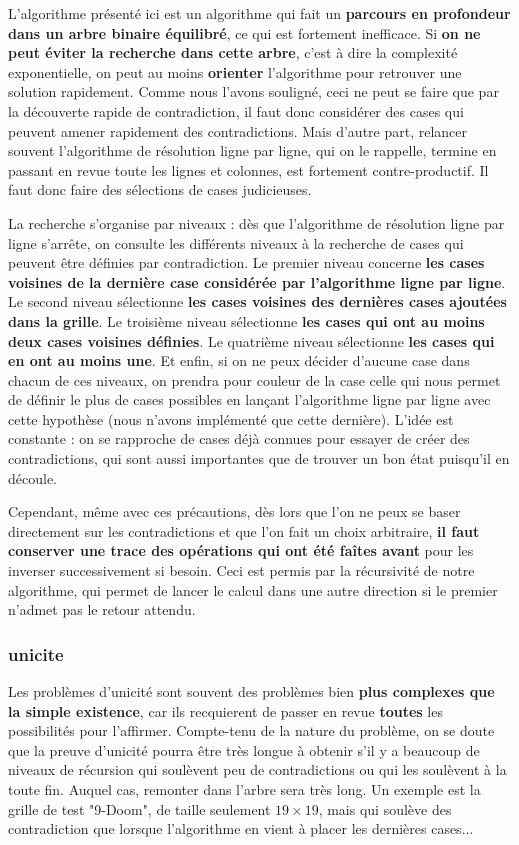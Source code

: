 \documentclass{report}
\begin{document}
L'algorithme présenté ici est un algorithme qui fait un \textbf{parcours en profondeur dans un arbre binaire équilibré}, ce qui est fortement inefficace. Si \textbf{on ne peut éviter la recherche dans cette arbre}, c'est à dire la complexité exponentielle, on peut au moins \textbf{orienter} l'algorithme pour retrouver une solution rapidement. Comme nous l'avons souligné, ceci ne peut se faire que par la découverte rapide de contradiction, il faut donc considérer des cases qui peuvent amener rapidement des contradictions. Mais d'autre part, relancer souvent l'algorithme de résolution ligne par ligne, qui on le rappelle, termine en passant en revue toute les lignes et colonnes, est fortement contre-productif. Il faut donc faire des sélections de cases judicieuses.

La recherche s'organise par niveaux : dès que l'algorithme de résolution ligne par ligne s'arrête, on consulte les différents niveaux à la recherche de cases qui peuvent être définies par contradiction. Le premier niveau concerne \textbf{les cases voisines de la dernière case considérée par l'algorithme ligne par ligne}. Le second niveau sélectionne \textbf{les cases voisines des dernières cases ajoutées dans la grille}. Le troisième niveau sélectionne \textbf{les cases qui ont au moins deux cases voisines définies}. Le quatrième niveau sélectionne \textbf{les cases qui en ont au moins une}. Et enfin, si on ne peux décider d'aucune case dans chacun de ces niveaux, on prendra pour couleur de la case celle qui nous permet de définir le plus de cases possibles en lançant l'algorithme ligne par ligne avec cette hypothèse (nous n'avons implémenté que cette dernière). L'idée est constante : on se rapproche de cases déjà connues pour essayer de créer des contradictions, qui sont aussi importantes que de trouver un bon état puisqu'il en découle.

Cependant, même avec ces précautions, dès lors que l'on ne peux se baser directement sur les contradictions et que l'on fait un choix arbitraire, \textbf{il faut conserver une trace des opérations qui ont été faîtes avant} pour les inverser successivement si besoin. Ceci est permis par la récursivité de notre algorithme, qui permet de lancer le calcul dans une autre direction si le premier n'admet pas le retour attendu.

\subsubsection{unicite}
Les problèmes d'unicité sont souvent des problèmes bien \textbf{plus complexes que la simple existence}, car ils recquierent de passer en revue \textbf{toutes} les possibilités pour l'affirmer. Compte-tenu de la nature du problème, on se doute que la preuve d'unicité pourra être très longue à obtenir s'il y a beaucoup de niveaux de récursion qui soulèvent peu de contradictions ou qui les soulèvent à la toute fin. Auquel cas, remonter dans l'arbre sera très long. Un exemple est la grille de test "9-Doom", de taille seulement $19\times 19$, mais qui soulève des contradiction que lorsque l'algorithme en vient à placer les dernières cases...\\
\end{document}

